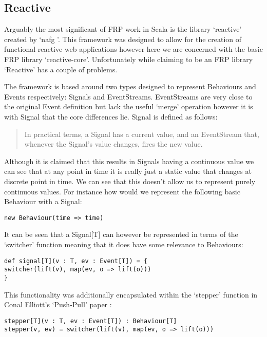     \subsection{Reactive}
      Arguably the most significant of FRP work in Scala is the library `reactive' created by `nafg \cite{Nafg}'. This    
      framework was designed to allow for the creation of functional reactive web applications however here we are concerned 
      with the basic FRP library `reactive-core'. Unfortunately while claiming to be an FRP library `Reactive'
      has a couple of problems.
      
      The framework is based around two types designed to represent Behaviours and Events respectively: Signals
      and EventStreams. EventStreams are very close to the original Event definition but lack the
      useful `merge' operation however it is with Signal that the core differences lie. Signal is defined as follows:
      
      \begin{quote}
        In practical terms, a Signal has a current value, and an EventStream that, whenever the Signal's value changes,     
        fires the new value.
      \end{quote}  
      
      Although it is claimed that this results in Signals having a continuous value we can see
      that at any point in time it is really just a static value that changes at discrete point in
      time. We can see that this doesn't allow us to represent purely continuous values. For instance
      how would we represent the following basic Behaviour with a Signal:
      
\begin{verbatim}
new Behaviour(time => time)
\end{verbatim}

      It can be seen that a Signal[T] can however be represented in terms
      of the `switcher' function meaning that it does have some relevance to Behaviours:
      
\begin{verbatim}
def signal[T](v : T, ev : Event[T]) = {
switcher(lift(v), map(ev, o => lift(o)))
}
\end{verbatim}  

      This functionality was additionally encapsulated within the `stepper' function in Conal Elliott's
      `Push-Pull' paper \cite{Elliott2009}:

\begin{verbatim}
stepper[T](v : T, ev : Event[T]) : Behaviour[T]
stepper(v, ev) = switcher(lift(v), map(ev, o => lift(o)))
\end{verbatim} 

